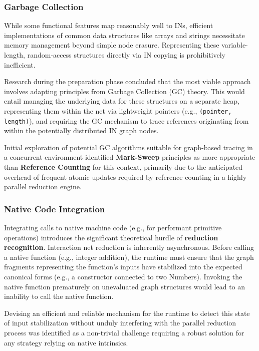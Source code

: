 \subsubsection{Garbage Collection}

While some functional features map reasonably well to INs, efficient implementations of common data structures like arrays and strings necessitate memory management beyond simple node erasure. Representing these variable-length, random-access structures directly via IN copying is prohibitively inefficient. 

Research during the preparation phase concluded that the most viable approach involves adapting principles from Garbage Collection (GC) theory. This would entail managing the underlying data for these structures on a separate heap, representing them within the net via lightweight pointers (e.g., \texttt{(pointer, length)}), and requiring the GC mechanism to trace references originating from within the potentially distributed IN graph nodes.

Initial exploration of potential GC algorithms suitable for graph-based tracing in a concurrent environment identified \textbf{Mark-Sweep} principles as more appropriate than \textbf{Reference Counting} for this context, primarily due to the anticipated overhead of frequent atomic updates required by reference counting in a highly parallel reduction engine.

\subsubsection{Native Code Integration}

Integrating calls to native machine code (e.g., for performant primitive operations) introduces the significant theoretical hurdle of \textbf{reduction recognition}. Interaction net reduction is inherently asynchronous. Before calling a native function (e.g., integer addition), the runtime must ensure that the graph fragments representing the function's inputs have stabilized into the expected canonical forms (e.g., a constructor connected to two Numbers). Invoking the native function prematurely on unevaluated graph structures would lead to an inability to call the native function.

Devising an efficient and reliable mechanism for the runtime to detect this state of input stabilization without unduly interfering with the parallel reduction process was identified as a non-trivial challenge requiring a robust solution for any strategy relying on native intrinsics.


